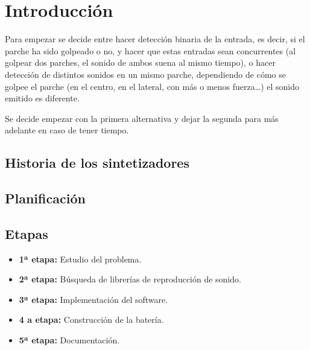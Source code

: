 
\chapter{Introducción} %
\label{cha:Introduccion}

    Para empezar se decide entre hacer detección binaria de la entrada, es decir, si el parche ha sido golpeado o no, y
    hacer que estas entradas sean concurrentes (al golpear dos parches, el sonido de ambos suena al mismo tiempo), o
    hacer detección de distintos sonidos en un mismo parche, dependiendo de cómo se golpee el parche (en el centro, en
    el lateral, con más o menos fuerza…) el sonido emitido es diferente.\newline

    Se decide empezar con la primera alternativa y dejar la segunda para más adelante en caso de tener tiempo.

    \section{Historia de los sintetizadores} %
    \label{sec:HistoriaDeLosSintetizadores}



    \section{Planificación} %
    \label{sec:Planificacion}

        \section{Etapas} %
        \label{sec:Etapas}

            \begin{itemize}
                \item \textbf{1ª etapa:} Estudio del problema.

                \item \textbf{2ª etapa:} Búsqueda de librerías de reproducción de sonido.

                \item \textbf{3ª etapa:} Implementación del software.

                \item \textbf{4 a etapa:} Construcción de la batería.

                \item \textbf{5ª etapa:} Documentación.
            \end{itemize}
            

